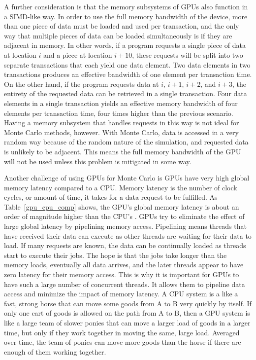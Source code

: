 \documentclass[preprint,12pt]{elsarticle}
\begin{document}
A further consideration is that the memory subsystems of GPUs also function in a SIMD-like way.  In order to use the full memory bandwidth of the device, more than one piece of data must be loaded and used per transaction, and the only way that multiple pieces of data can be loaded simultaneously is if they are adjacent in memory.  In other words, if a program requests a single piece of data at location $i$ and a piece at location $i+10$, these requests will be split into two separate transactions that each yield one data element. Two data elements in two transactions produces an effective bandwidth of one element per transaction time.  On the other hand, if the program requests data at $i$, $i+1$, $i+2$, and $i+3$, the entirety of the requested data can be retrieved in a single transaction.  Four data elements in a single transaction yields an effective memory bandwidth of four elements per transaction time, four times higher than the previous scenario.  Having a memory subsystem that handles requests in this way is not ideal for Monte Carlo methods, however.  With Monte Carlo, data is accessed in a very random way because of the random nature of the simulation, and requested data is unlikely to be adjacent.  This means the full memory bandwidth of the GPU will not be used unless this problem is mitigated in some way.

Another challenge of using GPUs for Monte Carlo is GPUs have very high global memory latency compared to a CPU.  Memory latency is the number of clock cycles, or amount of time, it takes for a data request to be fulfilled.  As Table~\ref{gpu_cpu_comp} shows, the GPU's global memory latency is about an order of magnitude higher than the CPU's \cite{cpu_latency,cuda}.  GPUs try to eliminate the effect of large global latency by pipelining memory access.  Pipelining means threads that have received their data can execute as other threads are waiting for their data to load.  If many requests are known, the data can be continually loaded as threads start to execute their jobs.  The hope is that the jobs take longer than the memory loads, eventually all data arrives, and the later threads appear to have zero latency for their memory access.  This is why it is important for GPUs to have such a large number of concurrent threads.  It allows them to pipeline data access and minimize the impact of memory latency.  A CPU system is a like a fast, strong horse that can move some goods from A to B very quickly by itself.  If only one cart of goods is allowed on the path from A to B, then a GPU system is like a large team of slower ponies that can move a larger load of goods in a larger time, but only if they work together in moving the same, large load.  Averaged over time, the team of ponies can move more goods than the horse if there are enough of them working together.
\end{document}
